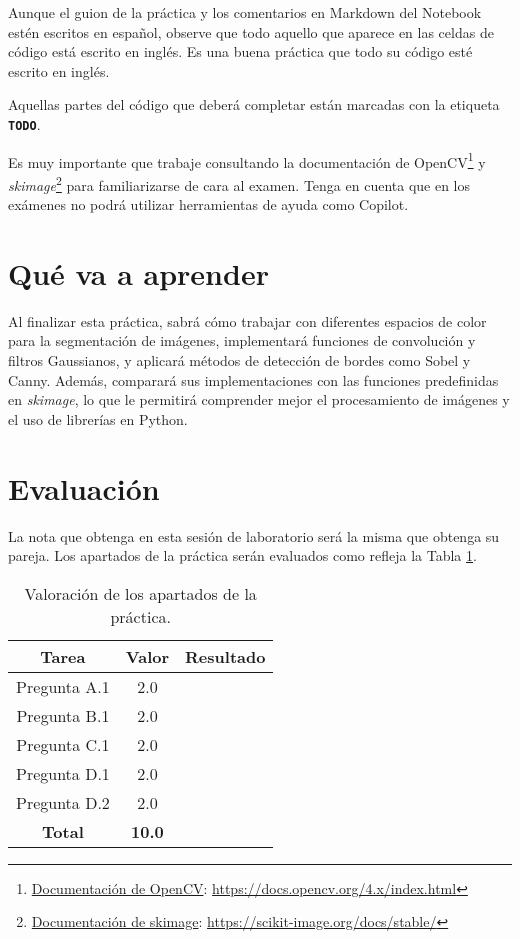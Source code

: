 Aunque el guion de la práctica y los comentarios en Markdown del Notebook estén escritos en español, observe que todo aquello que aparece en las celdas de código está escrito en inglés. Es una buena práctica que todo su código esté escrito en inglés.

Aquellas partes del código que deberá completar están marcadas con la etiqueta \textbf{\texttt{TODO}}.

Es muy importante que trabaje consultando la documentación de OpenCV\footnote{\href{https://docs.opencv.org/4.x/index.html}{Documentación de OpenCV}: \url{https://docs.opencv.org/4.x/index.html}} y \textit{skimage}\footnote{\href{https://scikit-image.org/docs/stable/}{Documentación de skimage}: \url{https://scikit-image.org/docs/stable/}} para familiarizarse de cara al examen. Tenga en cuenta que en los exámenes no podrá utilizar herramientas de ayuda como Copilot.

\section{Qué va a aprender}

Al finalizar esta práctica, sabrá cómo trabajar con diferentes espacios de color para la segmentación de imágenes, implementará funciones de convolución y filtros Gaussianos, y aplicará métodos de detección de bordes como Sobel y Canny. Además, comparará sus implementaciones con las funciones predefinidas en \textit{skimage}, lo que le permitirá comprender mejor el procesamiento de imágenes y el uso de librerías en Python.

\section{Evaluación}

La nota que obtenga en esta sesión de laboratorio será la misma que obtenga su pareja. Los apartados de la práctica serán evaluados como refleja la Tabla \ref{table:evaluacion}.

\begin{table}[h!]
    \centering
    \begin{tabular}{|c|c|c|}
    \hline
    \textbf{Tarea} & \textbf{Valor} & \textbf{Resultado} \\
    \hline
    Pregunta A.1 & 2.0 & \\
    \hline
    Pregunta B.1 & 2.0 & \\
    \hline
    Pregunta C.1 & 2.0 & \\
    \hline
    Pregunta D.1 & 2.0 & \\
    \hline
    Pregunta D.2 & 2.0 & \\
    \hline
    \textbf{Total} & \textbf{10.0} & \\
    \hline
    \end{tabular}
    \caption{Valoración de los apartados de la práctica.}
    \label{table:evaluacion}
\end{table}
